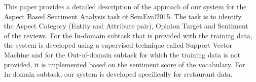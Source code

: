This paper provides a detailed description of the approach of our system for the Aspect Based Sentiment Analysis task of SemEval2015. The task is to identify the Aspect Category (Entity and Attribute pair), Opinion Target and Sentiment of the reviews. For the In-domain subtask that is provided with the training data, the system is developed using a supervised technique called Support Vector Machine and for the Out-of-domain subtask for which the training data is not provided, it is implemented based on the sentiment score of the vocabulary. For In-domain subtask, our system is developed specifically for restaurant data.
